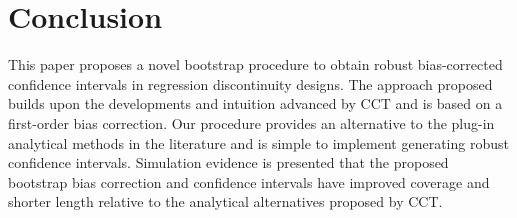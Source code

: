 \documentclass[12pt,fleqn]{article}
\begin{document}
\section{Conclusion}\label{conclusion}
This paper proposes a novel bootstrap procedure to obtain robust bias-corrected
confidence intervals in regression discontinuity designs. 
The approach proposed builds upon the developments and intuition advanced by CCT and is based on a first-order bias correction.
Our procedure provides an alternative to the plug-in analytical methods in the literature and is simple to implement generating robust confidence intervals.
Simulation evidence is presented that the proposed bootstrap bias correction and confidence intervals have improved coverage and shorter length relative to the analytical alternatives proposed by CCT.


\clearpage


\end{document}

